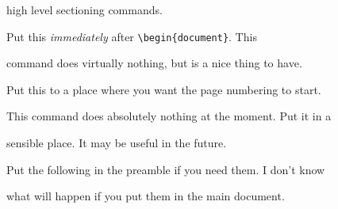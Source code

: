 \documentclass{bhamthesis}
\newcommand{\bksl}{\char`\\}
\newcommand{\cmd}[1]{\texttt{\bksl{}#1}}
\newcommand{\cmddessep}{\renewcommand{\labelsep}{2em}}
\begin{document}
high level sectioning commands.

\begin{description}\cmddessep

\item[\cmd{frontmatter}]

 Put this \emph{immediately} after \verb|\begin{document}|.  This

 command does virtually nothing, but is a nice thing to have.

\item[\cmd{mainmatter}]

 Put this to a place where you want the page numbering to start.

\item[\cmd{backmatter}]

 This command does absolutely nothing at the moment.  Put it in a

 sensible place.  It may be useful in the future.

\end{description}



Put the following in the preamble if you need them.  I don't know

what will happen if you put them in the main document.
\end{document}
